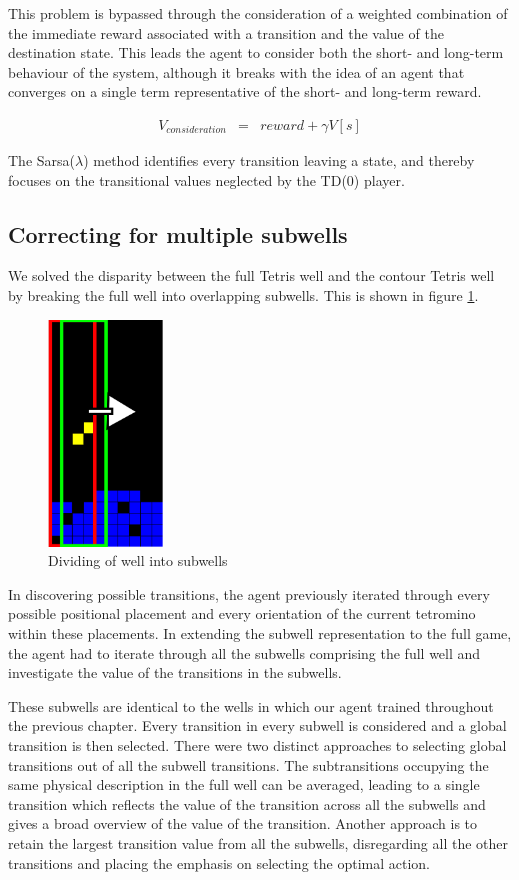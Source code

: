\documentclass{rucsthesis}
\begin{document}
This problem is bypassed through the consideration of a weighted combination of the immediate reward associated with a transition and the value of the destination state. This leads the agent to consider both the short- and long-term behaviour of the system, although it breaks with the idea of an agent that converges on a single term representative of the short- and long-term reward.

\begin{eqnarray*}
V_{consideration} & = & reward + \gamma V[s]
\end{eqnarray*} 
 
The Sarsa($\lambda$) method identifies every transition leaving a state, and thereby focuses on the transitional values neglected by the TD(0) player.

\subsection{Correcting for multiple subwells}

We solved the disparity between the full Tetris well and the contour Tetris well by breaking the full well into overlapping subwells. This is shown in figure \ref{fig:subwells}.

\begin{figure}[h]
\centering
\includegraphics[width=1.2in]{decomposedwell.png}
\caption{Dividing of well into subwells}
\label{fig:subwells}
\end{figure}

In discovering possible transitions, the agent previously iterated through every possible positional placement and every orientation of the current tetromino within these placements. In extending the subwell representation to the full game, the agent had to iterate through all the subwells comprising the full well and investigate the value of the transitions in the subwells.

These subwells are identical to the wells in which our agent trained throughout the previous chapter. Every transition in every subwell is considered and a global transition is then selected. There were two distinct approaches to selecting global transitions out of all the subwell transitions. The subtransitions occupying the same physical description in the full well can be averaged, leading to a single transition which reflects the value of the transition across all the subwells and gives a broad overview of the value of the transition. Another approach is to retain the largest transition value from all the subwells, disregarding all the other transitions and placing the emphasis on selecting the optimal action.
\end{document}
